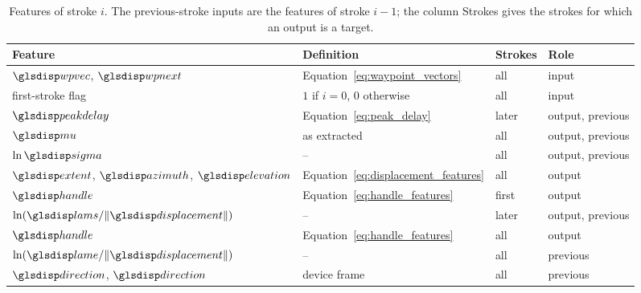 \documentclass[12pt]{report}
\begin{document}
\begin{table}[htbp]
    \centering
    \caption{Features of stroke $i$. The previous-stroke inputs are the features of stroke $i-1$; the column Strokes gives the strokes for which an output is a target.}
    \label{tab:network_features}
    \begin{tabular}{llll}
        \toprule
        Feature & Definition & Strokes & Role\\
        \midrule
        $\sym{wpvec}_i$, $\sym{wpnext}_i$                          & Equation~\eqref{eq:waypoint_vectors}      & all   & input\\
        first-stroke flag                                          & $1$ if $i=0$, $0$ otherwise               & all   & input\\
        $\sym{peakdelay}_i$                                        & Equation~\eqref{eq:peak_delay}            & later & output, previous\\
        $\sym{mu}_i$                                               & as extracted                              & all   & output, previous\\
        $\ln\sym{sigma}_i$                                         & --                                        & all   & output, previous\\
        $\sym{extent}_i$, $\sym{azimuth}_i$, $\sym{elevation}_i$   & Equation~\eqref{eq:displacement_features} & all   & output\\
        $\sym{handle}_{s,0}$                                       & Equation~\eqref{eq:handle_features}       & first & output\\
        $\ln(\sym{lams}_i/\lVert\sym{displacement}_i\rVert)$       & --                                        & later & output, previous\\
        $\sym{handle}_{e,i}$                                       & Equation~\eqref{eq:handle_features}       & all   & output\\
        $\ln(\sym{lame}_i/\lVert\sym{displacement}_i\rVert)$       & --                                        & all   & previous\\
        $\sym{direction}_i$, $\sym{direction}_{i+1}$               & device frame                              & all   & previous\\
        \bottomrule
    \end{tabular}
\end{table}
\end{document}
